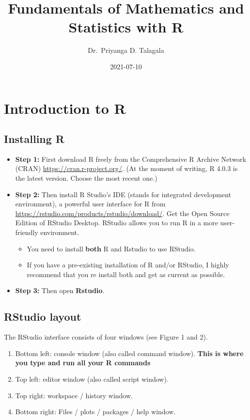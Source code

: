 \documentclass[
]{book}
\title{Fundamentals of Mathematics and Statistics with R}
\author{Dr.~Priyanga D. Talagala}
\date{2021-07-10}
\begin{document}
\maketitle

{
\setcounter{tocdepth}{1}
\tableofcontents
}
\hypertarget{intro}{%
\chapter{Introduction to R}\label{intro}}


\hypertarget{installing-r}{%
\section{Installing R}\label{installing-r}}

\begin{itemize}
\item
  \textbf{Step 1:} First download R freely from the Comprehensive R Archive Network (CRAN) \url{https://cran.r-project.org/}.
  (At the moment of writing, R 4.0.3 is the latest version. Choose the most recent one.)
\item
  \textbf{Step 2:} Then install R Studio's IDE (stands for integrated development environment), a powerful user interface for R from \url{https://rstudio.com/products/rstudio/download/}. Get the Open Source Edition of RStudio Desktop. RStudio allows you to run R in a more user-friendly environment.

  \begin{itemize}
  \item
    You need to install \textbf{both} R and Rstudio to use RStudio.
  \item
    If you have a pre-existing installation of R and/or RStudio, I highly recommend that you re install both and get as current as possible.
  \end{itemize}
\item
  \textbf{Step 3:} Then open \textbf{Rstudio}.
\end{itemize}

\hypertarget{rstudio-layout}{%
\section{RStudio layout}\label{rstudio-layout}}

The RStudio interface consists of four windows (see Figure 1 and 2).

\begin{enumerate}
\def\labelenumi{\arabic{enumi}.}
\item
  Bottom left: console window (also called command window). \textbf{This is where you type and run all your R commands}
\item
  Top left: editor window (also called script window).
\item
  Top right: workspace / history window.
\item
  Bottom right: Files / plots / packages / help window.
\end{enumerate}
\end{document}
